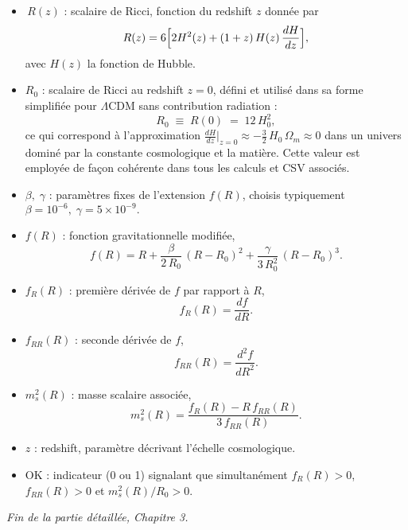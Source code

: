 \begin{itemize}
  \item \(\,R(z)\) : scalaire de Ricci, fonction du redshift \(z\) donnée par
    \[
      R(z)
      =6\Bigl[2H^2(z)+(1+z)\,H(z)\,\frac{dH}{dz}\Bigr],
    \]
    avec \(H(z)\) la fonction de Hubble.
  \item \(R_{0}\) : scalaire de Ricci au redshift \(z=0\), défini et       utilisé dans sa forme simplifiée pour \(\Lambda\)CDM sans              contribution radiation :
    \[
    R_{0} \;\equiv\; R(0) \;=\; 12\,H_{0}^{2},
    \]
    ce qui correspond à l’approximation
    \(\tfrac{dH}{dz}\bigl|_{z=0}\approx -\tfrac{3}{2}\,H_{0}\,\Omega_{m}\approx0\)
    dans un univers dominé par la constante cosmologique et la matière.
    Cette valeur est employée de façon cohérente dans tous les calculs et CSV associés.
  \item \(\beta,\;\gamma\) : paramètres fixes de l’extension \(f(R)\), choisis typiquement
    \(\beta=10^{-6},\;\gamma=5\times10^{-9}.\)
  \item \(f(R)\) : fonction gravitationnelle modifiée,
    \[
      f(R)
      =R
      +\frac{\beta}{2\,R_{0}}\,(R-R_{0})^{2}
      +\frac{\gamma}{3\,R_{0}^{2}}\,(R-R_{0})^{3}.
    \]
  \item \(f_{R}(R)\) : première dérivée de \(f\) par rapport à \(R\),
    \[
      f_{R}(R)=\frac{df}{dR}.
    \]
  \item \(f_{RR}(R)\) : seconde dérivée de \(f\),
    \[
      f_{RR}(R)=\frac{d^{2}f}{dR^{2}}.
    \]
  \item \(m_{s}^{2}(R)\) : masse scalaire associée,
    \[
      m_{s}^{2}(R)
      =\frac{f_{R}(R)-R\,f_{RR}(R)}{3\,f_{RR}(R)}.
    \]
  \item \(z\) : redshift, paramètre décrivant l’échelle cosmologique.
  \item \(\mathrm{OK}\) : indicateur (0 ou 1) signalant que simultanément
    \(f_{R}(R)>0\), \(f_{RR}(R)>0\) et \(m_{s}^{2}(R)/R_{0}>0\).
\end{itemize}

\bigskip
\noindent\emph{Fin de la partie détaillée, Chapitre 3.}
